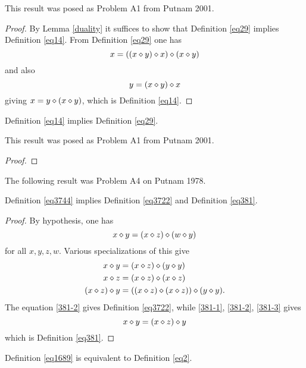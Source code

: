 This result was posed as Problem A1 from Putnam 2001.

\begin{proof}\leanok{} By Lemma \ref{duality} it suffices to show that Definition \ref{eq29} implies Definition \ref{eq14}.  From Definition \ref{eq29} one has
  $$ x = ((x \diamond y) \diamond x) \diamond (x \diamond y)$$
  and also
  $$ y = (x \diamond y) \diamond x$$
  giving $x = y \diamond (x \diamond y)$, which is Definition \ref{eq14}.
\end{proof}

\begin{theorem}[14 implies 29]\label{14_implies_29} \leanok  Definition \ref{eq14} implies Definition \ref{eq29}.
\end{theorem}

This result was posed as Problem A1 from Putnam 2001.

\begin{proof}\leanok
\end{proof}

The following result was Problem A4 on Putnam 1978.

\begin{theorem}[3744 implies 3722, 381]\label{3744_implies_3722_381}\leanok Definition \ref{eq3744} implies Definition \ref{eq3722} and Definition \ref{eq381}.
\end{theorem}

\begin{proof}\leanok By hypothesis, one has
$$x \diamond y = (x \diamond z) \diamond (w \diamond y)
  $$
for all $x,y,z,w$.  Various specializations of this give
\begin{align}
 x \diamond y &= (x \diamond z) \diamond (y \diamond y) \label{381-1} \\
 x \diamond z &= (x \diamond z) \diamond (x \diamond z) \label{381-2} \\
(x \diamond z) \diamond y &= ((x \diamond z) \diamond (x \diamond z)) \diamond (y \diamond y) \label{381-3}.
\end{align}
The equation \eqref{381-2} gives Definition \ref{eq3722}, while \eqref{381-1}, \eqref{381-2}, \eqref{381-3} gives
$$ x \diamond y = (x\diamond z) \diamond y$$
which is Definition \ref{eq381}.
\end{proof}

\begin{theorem}[1689 is equivalent to 2]\label{1689_equiv_2}\leanok Definition \ref{eq1689} is equivalent to Definition \ref{eq2}.
\end{theorem}


